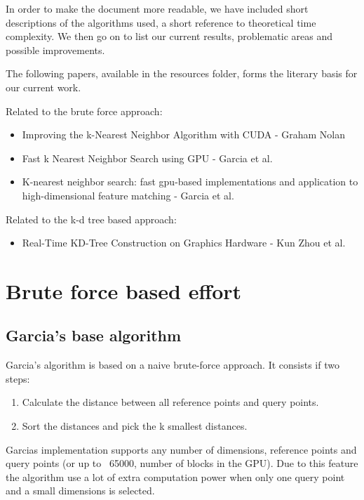 In order to make the document more readable, we have included short descriptions of the algorithms used, a short reference to theoretical time complexity. We then go on to list our current results, problematic areas and possible improvements.

The following papers, available in the resources folder, forms the literary basis for our current work.

Related to the brute force approach:
\begin{itemize}
    \item Improving the k-Nearest Neighbor Algorithm with CUDA - Graham Nolan
    \item Fast k Nearest Neighbor Search using GPU - Garcia et al.
    \item K-nearest neighbor search: fast gpu-based implementations and application to high-dimensional feature matching - Garcia et al.
\end{itemize}

Related to the k-d tree based approach:
\begin{itemize}
    \item Real-Time KD-Tree Construction on Graphics Hardware - Kun Zhou et al.
\end{itemize}


\section{Brute force based effort} %
\label{sub:brute_force_based_effort}

\subsection{Garcia's base algorithm} %
\label{ssub:garcias_base_algorithme}

Garcia's algorithm is based on a naive brute-force approach. It consists if two steps:
\begin{enumerate}
    \item Calculate the distance between all reference points and query points.
    \item Sort the distances and pick the k smallest distances.
\end{enumerate}

Garcias implementation supports any number of dimensions, reference points and query points (or up to ~65000, number of blocks in the GPU). Due to this feature the algorithm use a lot of extra computation power when only one query point and a small dimensions is selected.

